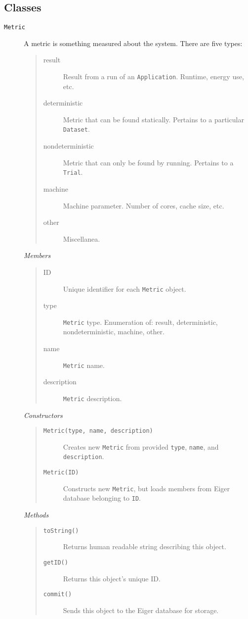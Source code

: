 \subsection{Classes}
\begin{description}
\item[\texttt{Metric}] A metric is something measured about the system. There are five types:
	\begin{quote}
	\begin{description}
	\item[result] Result from a run of an \texttt{Application}. Runtime, energy use, etc.
	\item[deterministic] Metric that can be found statically. Pertains to a particular \texttt{Dataset}.
	\item[nondeterministic] Metric that can only be found by running. Pertains to a \texttt{Trial}.
	\item[machine] Machine parameter. Number of cores, cache size, etc.
	\item[other] Miscellanea.
	\end{description}
	\end{quote}
  {\em Members}
	\begin{quote}
	\begin{description}
    \item[ID] Unique identifier for each \texttt{Metric} object.
    \item[type] \texttt{Metric} type. Enumeration of: result, deterministic, nondeterministic, machine, other.
    \item[name] \texttt{Metric} name.
    \item[description] \texttt{Metric} description.
	\end{description}
	\end{quote}
  {\em Constructors}
	\begin{quote}
	\begin{description}
    \item[\texttt{Metric(type, name, description)}] Creates new \texttt{Metric} from provided \texttt{type}, \texttt{name}, and \texttt{description}.
    \item[\texttt{Metric(ID)}] Constructs new \texttt{Metric}, but loads members from Eiger database belonging to \texttt{ID}.
	\end{description}
	\end{quote}
	{\em Methods}
	\begin{quote}
	\begin{description}
	\item[\texttt{toString()}] Returns human readable string describing this object.
	\item[\texttt{getID()}] Returns this object's unique ID.
	\item[\texttt{commit()}] Sends this object to the Eiger database for storage.
	\end{description}
	\end{quote}


\end{description}
